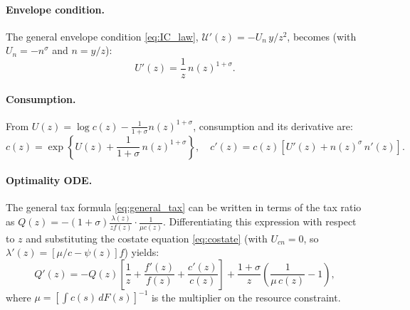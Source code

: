 \documentclass[12pt,a4paper]{article}
\theoremstyle{definition}
\theoremstyle{plain}
\theoremstyle{remark}
\newcommand{\calU}{\mathcal{U}}
\begin{document}
\paragraph{Envelope condition.} The general envelope condition \eqref{eq:IC_law}, $\calU'(z) = -U_n \, y/z^2$, becomes (with $U_n = -n^{\sigma}$ and $n = y/z$):
\begin{equation}
  U'(z) = \frac{1}{z}\,n(z)^{1+\sigma}.
  \label{eq:ode_envelope}
\end{equation}

\paragraph{Consumption.} From $U(z) = \log c(z) - \frac{1}{1+\sigma}n(z)^{1+\sigma}$, consumption and its derivative are:
\begin{equation}
  c(z) = \exp\!\left\{U(z) + \frac{1}{1+\sigma}\,n(z)^{1+\sigma}\right\}, \quad c'(z) = c(z)\!\left[U'(z) + n(z)^{\sigma}\,n'(z)\right].
  \label{eq:ode_consumption}
\end{equation}

\paragraph{Optimality ODE.} The general tax formula \eqref{eq:general_tax} can be written in terms of the tax ratio as $Q(z) = -(1+\sigma)\frac{\lambda(z)}{z f(z)} \cdot \frac{1}{\mu c(z)}$. Differentiating this expression with respect to $z$ and substituting the costate equation \eqref{eq:costate} (with $U_{cn} = 0$, so $\lambda'(z) = [\mu/c - \psi(z)]f$) yields:
\begin{equation}
  Q'(z) = -Q(z)\!\left[\frac{1}{z} + \frac{f'(z)}{f(z)} + \frac{c'(z)}{c(z)}\right] + \frac{1+\sigma}{z}\!\left(\frac{1}{\mu\, c(z)} - 1\right),
  \label{eq:ode_Q}
\end{equation}
where $\mu = [\int c(s)\,dF(s)]^{-1}$ is the multiplier on the resource constraint.
\end{document}
